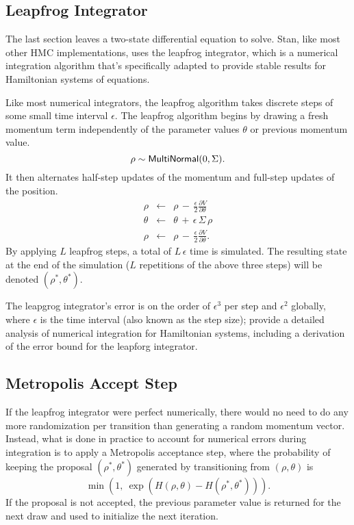 \subsection{Leapfrog Integrator}

The last section leaves a two-state differential equation to solve.
Stan, like most other HMC implementations, uses the leapfrog
integrator, which is a numerical integration algorithm that's
specifically adapted to provide stable results for Hamiltonian systems
of equations.

Like most numerical integrators, the leapfrog algorithm takes discrete
steps of some small time interval $\epsilon$. The leapfrog algorithm
begins by drawing a fresh momentum term independently of the parameter
values $\theta$ or previous momentum value.
%
\[
\rho \sim \distro{MultiNormal}(0,\Sigma).
\]
It then alternates half-step updates of the momentum and full-step
updates of the position.
%
\vspace*{-6pt}
\begin{eqnarray*}
\rho & \leftarrow
     & \rho \, - \, \frac{\epsilon}{2} \frac{\partial V}{\partial \theta}
\\[6pt]
\theta & \leftarrow
       & \theta \, + \, \epsilon \, \Sigma \, \rho
\\[6pt]
\rho & \leftarrow
     & \rho \, - \, \frac{\epsilon}{2} \frac{\partial V}{\partial \theta}.
\end{eqnarray*}
%
By applying $L$ leapfrog steps, a total of $L \, \epsilon$ time is
simulated. The resulting state at the end of the simulation ($L$
repetitions of the above three steps) will be denoted
$(\rho^{*},\theta^{*})$.

The leapgrog integrator's error is on the order of $\epsilon^3$ per
step and $\epsilon^2$ globally, where $\epsilon$ is the time interval
(also known as the step size);  \cite{LeimkuhlerReich:2004} provide a
detailed analysis of numerical integration for Hamiltonian systems,
including a derivation of the error bound for the leapforg
integrator.


\subsection{Metropolis Accept Step}

If the leapfrog integrator were perfect numerically, there would no
need to do any more randomization per transition than generating a
random momentum vector. Instead, what is done in practice to account
for numerical errors during integration is to apply a Metropolis
acceptance step, where the probability of keeping the proposal
$(\rho^{*},\theta^{*})$ generated by transitioning from $(\rho,\theta)$ is
%
\[
\min\!\left(1, \ \exp\!\left( H(\rho,\theta) - H(\rho^{*},\theta^{*})\right)\right).
\]
%
If the proposal is not accepted, the previous parameter value is
returned for the next draw and used to initialize the next iteration.


